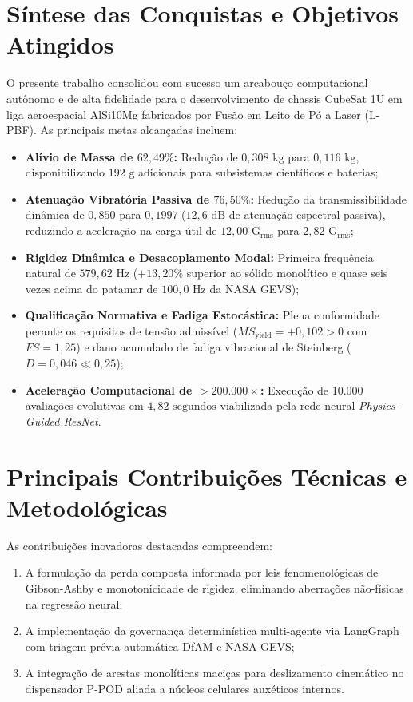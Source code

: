 \documentclass[12pt,a4paper]{report}
\begin{document}
\section{Síntese das Conquistas e Objetivos Atingidos}
O presente trabalho consolidou com sucesso um arcabouço computacional autônomo e de alta fidelidade para o desenvolvimento de chassis CubeSat 1U em liga aeroespacial AlSi10Mg fabricados por Fusão em Leito de Pó a Laser (L-PBF). As principais metas alcançadas incluem:
\begin{itemize}
    \item \textbf{Alívio de Massa de $62{,}49\%$:} Redução de $0{,}308\text{ kg}$ para $0{,}116\text{ kg}$, disponibilizando $192\text{ g}$ adicionais para subsistemas científicos e baterias;
    \item \textbf{Atenuação Vibratória Passiva de $76{,}50\%$:} Redução da transmissibilidade dinâmica de $0{,}850$ para $0{,}1997$ ($12{,}6\text{ dB}$ de atenuação espectral passiva), reduzindo a aceleração na carga útil de $12{,}00\text{ G}_{\text{rms}}$ para $2{,}82\text{ G}_{\text{rms}}$;
    \item \textbf{Rigidez Dinâmica e Desacoplamento Modal:} Primeira frequência natural de $579{,}62\text{ Hz}$ ($+13{,}20\%$ superior ao sólido monolítico e quase seis vezes acima do patamar de $100{,}0\text{ Hz}$ da NASA GEVS);
    \item \textbf{Qualificação Normativa e Fadiga Estocástica:} Plena conformidade perante os requisitos de tensão admissível ($MS_{\text{yield}} = +0{,}102 > 0$ com $FS = 1{,}25$) e dano acumulado de fadiga vibracional de Steinberg ($D = 0{,}046 \ll 0{,}25$);
    \item \textbf{Aceleração Computacional de $> 200.000\times$:} Execução de 10.000 avaliações evolutivas em $4{,}82\text{ segundos}$ viabilizada pela rede neural \textit{Physics-Guided ResNet}.
\end{itemize}

\section{Principais Contribuições Técnicas e Metodológicas}
As contribuições inovadoras destacadas compreendem:
\begin{enumerate}
    \item A formulação da perda composta informada por leis fenomenológicas de Gibson-Ashby e monotonicidade de rigidez, eliminando aberrações não-físicas na regressão neural;
    \item A implementação da governança determinística multi-agente via LangGraph com triagem prévia automática DfAM e NASA GEVS;
    \item A integração de arestas monolíticas maciças para deslizamento cinemático no dispensador P-POD aliada a núcleos celulares auxéticos internos.
\end{enumerate}
\end{document}
